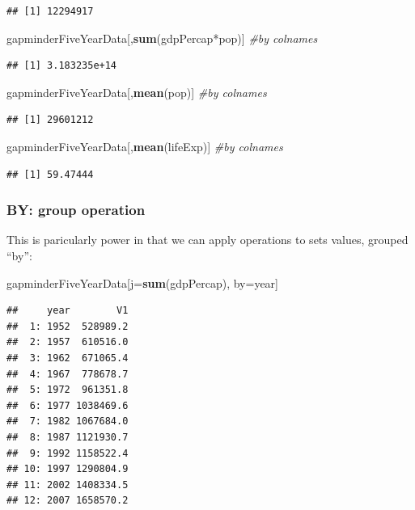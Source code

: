 \documentclass[]{article}
\newenvironment{Shaded}{\begin{snugshade}}{\end{snugshade}}
\newcommand{\KeywordTok}[1]{\textcolor[rgb]{0.13,0.29,0.53}{\textbf{{#1}}}}
\newcommand{\CommentTok}[1]{\textcolor[rgb]{0.56,0.35,0.01}{\textit{{#1}}}}
\newcommand{\NormalTok}[1]{{#1}}
\begin{document}
\begin{verbatim}
## [1] 12294917
\end{verbatim}

\begin{Shaded}
\begin{Highlighting}[]
\NormalTok{gapminderFiveYearData[,}\KeywordTok{sum}\NormalTok{(gdpPercap*pop)] }\CommentTok{#by colnames}
\end{Highlighting}
\end{Shaded}

\begin{verbatim}
## [1] 3.183235e+14
\end{verbatim}

\begin{Shaded}
\begin{Highlighting}[]
\NormalTok{gapminderFiveYearData[,}\KeywordTok{mean}\NormalTok{(pop)] }\CommentTok{#by colnames}
\end{Highlighting}
\end{Shaded}

\begin{verbatim}
## [1] 29601212
\end{verbatim}

\begin{Shaded}
\begin{Highlighting}[]
\NormalTok{gapminderFiveYearData[,}\KeywordTok{mean}\NormalTok{(lifeExp)] }\CommentTok{#by colnames}
\end{Highlighting}
\end{Shaded}

\begin{verbatim}
## [1] 59.47444
\end{verbatim}

\subsubsection{BY: group operation}\label{by-group-operation}

This is paricularly power in that we can apply operations to sets
values, grouped ``by'':

\begin{Shaded}
\begin{Highlighting}[]
\NormalTok{gapminderFiveYearData[j=}\KeywordTok{sum}\NormalTok{(gdpPercap), by=year]}
\end{Highlighting}
\end{Shaded}

\begin{verbatim}
##     year        V1
##  1: 1952  528989.2
##  2: 1957  610516.0
##  3: 1962  671065.4
##  4: 1967  778678.7
##  5: 1972  961351.8
##  6: 1977 1038469.6
##  7: 1982 1067684.0
##  8: 1987 1121930.7
##  9: 1992 1158522.4
## 10: 1997 1290804.9
## 11: 2002 1408334.5
## 12: 2007 1658570.2
\end{verbatim}
\end{document}
